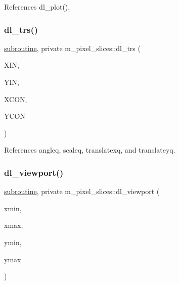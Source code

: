 References dl\+\_\+plot().

\mbox{\label{namespacem__pixel__slices_a141b4da9ce5a0d633cc488f656c0320d}} 
\subsubsection{\texorpdfstring{dl\+\_\+trs()}{dl\_trs()}}
{\footnotesize\ttfamily \hyperlink{M__stopwatch_83_8txt_acfbcff50169d691ff02d4a123ed70482}{subroutine}, private m\+\_\+pixel\+\_\+slices\+::dl\+\_\+trs (\begin{DoxyParamCaption}\item[{}]{X\+IN,  }\item[{}]{Y\+IN,  }\item[{}]{X\+C\+ON,  }\item[{}]{Y\+C\+ON }\end{DoxyParamCaption})\hspace{0.3cm}{\ttfamily [private]}}



References angleq, scaleq, translatexq, and translateyq.

\mbox{\label{namespacem__pixel__slices_a87a664883c6c5e0e2812df4d1ea29515}} 
\subsubsection{\texorpdfstring{dl\+\_\+viewport()}{dl\_viewport()}}
{\footnotesize\ttfamily \hyperlink{M__stopwatch_83_8txt_acfbcff50169d691ff02d4a123ed70482}{subroutine}, private m\+\_\+pixel\+\_\+slices\+::dl\+\_\+viewport (\begin{DoxyParamCaption}\item[{}]{xmin,  }\item[{}]{xmax,  }\item[{}]{ymin,  }\item[{}]{ymax }\end{DoxyParamCaption})\hspace{0.3cm}{\ttfamily [private]}}



